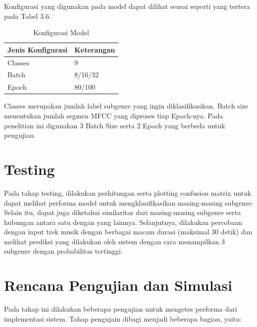 Konfigurasi yang digunakan pada model dapat dilihat seusai seperti yang tertera pada Tabel 3.6.

\begin{table}[h]
	
	\centering
	
	\caption{Konfigurasi Model}
	
	\begin{tabular}{|l|l|}
		\hline
		\textbf{Jenis Konfigurasi} & \textbf{Keterangan} \\ \hline
		Classes                    & 9                   \\ \hline
		Batch                      & 8/16/32                 \\ \hline
		Epoch                      & 80/100                  \\ \hline
	\end{tabular}

	\label{fig:konfigurasimodel}
\end{table}

Classes merupakan jumlah label subgenre yang ingin diklasifikasikan. Batch size menentukan jumlah segmen MFCC yang diproses tiap Epoch-nya. Pada penelitian ini digunakan 3 Batch Size serta 2 Epoch yang berbeda untuk pengujian. 

\section{Testing}
\label{sec:testing}

Pada tahap testing, dilakukan perhitungan serta plotting confusion matrix untuk dapat melihat performa model untuk mengklasifikasikan masing-masing subgenre. Selain itu, dapat juga diketahui similaritas dari masing-masing subgenre serta hubungan antara satu dengan yang lainnya. Selanjutnya, dilakukan percobaan dengan input trek musik dengan berbagai macam durasi (maksimal 30 detik) dan melihat prediksi yang dilakukan oleh sistem dengan cara menampilkan 3 subgenre dengan probabilitas tertinggi.

\section{Rencana Pengujian dan Simulasi}
\label{sec:rencanapengujian}

Pada tahap ini dilakukan beberapa pengujian untuk mengetes performa dari implementasi sistem. Tahap pengujain dibagi menjadi beberapa bagian, yaitu:

